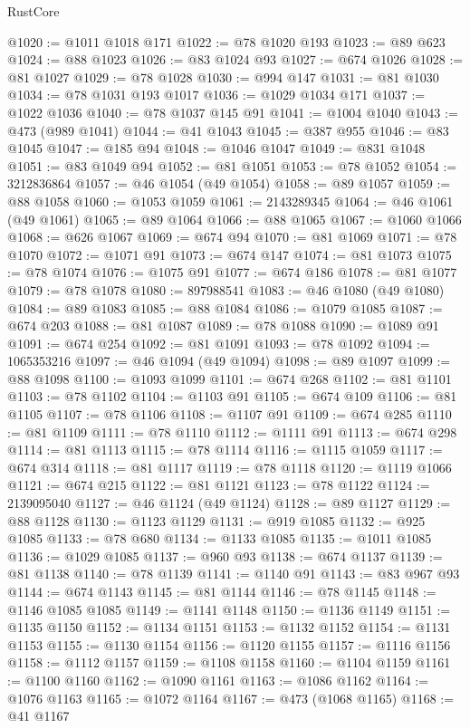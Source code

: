 \begin{lexlean}{RustCore}
\begin{coremodule}
@1020 := @1011 @1018 @171
@1022 := @78 @1020 @193
@1023 := @89 @623
@1024 := @88 @1023
@1026 := @83 @1024 @93
@1027 := @674 @1026
@1028 := @81 @1027
@1029 := @78 @1028
@1030 := @994 @147
@1031 := @81 @1030
@1034 := @78 @1031 @193 @1017
@1036 := @1029 @1034 @171
@1037 := @1022 @1036
@1040 := @78 @1037 @145 @91
@1041 := @1004 @1040
@1043 := @473 (@989 @1041)
@1044 := @41 @1043
@1045 := @387 @955
@1046 := @83 @1045
@1047 := @185 @94
@1048 := @1046 @1047
@1049 := @831 @1048
@1051 := @83 @1049 @94
@1052 := @81 @1051
@1053 := @78 @1052
@1054 := 3212836864
@1057 := @46 @1054 (@49 @1054)
@1058 := @89 @1057
@1059 := @88 @1058
@1060 := @1053 @1059
@1061 := 2143289345
@1064 := @46 @1061 (@49 @1061)
@1065 := @89 @1064
@1066 := @88 @1065
@1067 := @1060 @1066
@1068 := @626 @1067
@1069 := @674 @94
@1070 := @81 @1069
@1071 := @78 @1070
@1072 := @1071 @91
@1073 := @674 @147
@1074 := @81 @1073
@1075 := @78 @1074
@1076 := @1075 @91
@1077 := @674 @186
@1078 := @81 @1077
@1079 := @78 @1078
@1080 := 897988541
@1083 := @46 @1080 (@49 @1080)
@1084 := @89 @1083
@1085 := @88 @1084
@1086 := @1079 @1085
@1087 := @674 @203
@1088 := @81 @1087
@1089 := @78 @1088
@1090 := @1089 @91
@1091 := @674 @254
@1092 := @81 @1091
@1093 := @78 @1092
@1094 := 1065353216
@1097 := @46 @1094 (@49 @1094)
@1098 := @89 @1097
@1099 := @88 @1098
@1100 := @1093 @1099
@1101 := @674 @268
@1102 := @81 @1101
@1103 := @78 @1102
@1104 := @1103 @91
@1105 := @674 @109
@1106 := @81 @1105
@1107 := @78 @1106
@1108 := @1107 @91
@1109 := @674 @285
@1110 := @81 @1109
@1111 := @78 @1110
@1112 := @1111 @91
@1113 := @674 @298
@1114 := @81 @1113
@1115 := @78 @1114
@1116 := @1115 @1059
@1117 := @674 @314
@1118 := @81 @1117
@1119 := @78 @1118
@1120 := @1119 @1066
@1121 := @674 @215
@1122 := @81 @1121
@1123 := @78 @1122
@1124 := 2139095040
@1127 := @46 @1124 (@49 @1124)
@1128 := @89 @1127
@1129 := @88 @1128
@1130 := @1123 @1129
@1131 := @919 @1085
@1132 := @925 @1085
@1133 := @78 @680
@1134 := @1133 @1085
@1135 := @1011 @1085
@1136 := @1029 @1085
@1137 := @960 @93
@1138 := @674 @1137
@1139 := @81 @1138
@1140 := @78 @1139
@1141 := @1140 @91
@1143 := @83 @967 @93
@1144 := @674 @1143
@1145 := @81 @1144
@1146 := @78 @1145
@1148 := @1146 @1085 @1085
@1149 := @1141 @1148
@1150 := @1136 @1149
@1151 := @1135 @1150
@1152 := @1134 @1151
@1153 := @1132 @1152
@1154 := @1131 @1153
@1155 := @1130 @1154
@1156 := @1120 @1155
@1157 := @1116 @1156
@1158 := @1112 @1157
@1159 := @1108 @1158
@1160 := @1104 @1159
@1161 := @1100 @1160
@1162 := @1090 @1161
@1163 := @1086 @1162
@1164 := @1076 @1163
@1165 := @1072 @1164
@1167 := @473 (@1068 @1165)
@1168 := @41 @1167

\end{coremodule}
\end{lexlean}
